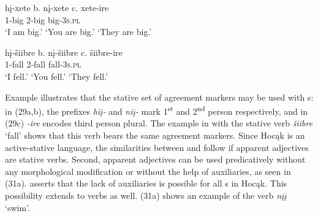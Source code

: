 \documentclass[output=paper]{LSP/langsci}
\begin{document}
\begin{exe}
\ex\label{ex:rosen:29}
\begin{xlist}
\ex \gll
hį-xete \hspace{36pt} b. {}  nį-xete \hspace{48pt} c. {} xete-ire\\
1-big {} {} {} 2-big {} {}  {} big-\textsc{3s.pl}\\
\glt `I am big.' \hspace{1.2cm} `You are big.' \hspace{1.1cm} `They are big.'

\end{xlist}
\end{exe}

\begin{exe}
\ex\label{ex:rosen:30}
\begin{xlist}
\ex \gll
hį-šiibre \hspace{30pt}  b. {} nį-šiibre \hspace{43pt} c. {} šiibre-ire\\
1-fall {} {} {} 2-fall {} {} {} fall-\textsc{3s.pl}\\
\glt `I fell.' \hspace{1.8cm} `You fell.'  \hspace{1.8cm} `They fell.'


\end{xlist}
\end{exe}

 
Example  illustrates that the stative set of agreement markers may be used with s: in (29a,b), the prefixes \textit{hiį-} and \textit{niį-} mark 1\textsuperscript{st} and 2\textsuperscript{nd} person respectively, and in (29c) \textit{-ire} encodes third person plural. The example in  with the stative verb \textit{šiibre} `fall' shows that this verb bears the same agreement markers. Since Hocąk is an active-stative language, the similarities between  and  follow if apparent adjectives are stative verbs. Second, apparent adjectives can be used predicatively without any morphological modification or without the help of auxiliaries, as seen in (31a). \citet{Helmbrecht2006b} asserts that the lack of auxiliaries is possible for all s in Hocąk. This possibility extends to verbs as well. (31a) shows an example of the verb \textit{nįį} `swim'.
 
\end{document}
